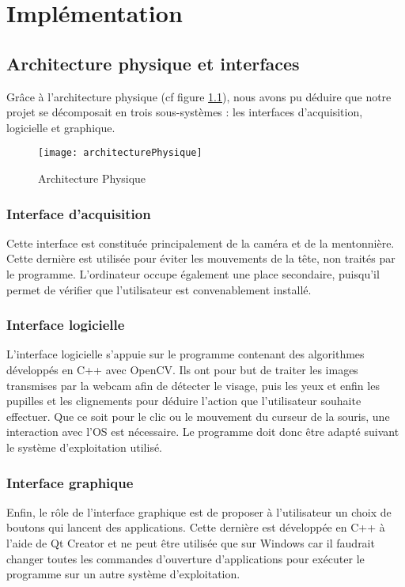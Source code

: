 \chapter{Implémentation}

\section{Architecture physique et interfaces}

Grâce à l'architecture physique (cf figure \ref{fig:archiPhysique}), nous avons pu déduire que notre projet se décomposait en trois sous-systèmes : les interfaces d'acquisition, logicielle et graphique.

\begin{figure}[H]
  \centering
  \texttt{[image: architecturePhysique]}
  \caption{Architecture Physique}
  \label{fig:archiPhysique}
\end{figure}

\subsection{Interface d'acquisition}
Cette interface est constituée principalement de la caméra et de la mentonnière. Cette dernière est utilisée pour éviter les mouvements de la tête, non traités par le programme. L'ordinateur occupe également une place secondaire, puisqu'il permet de vérifier que l'utilisateur est convenablement installé.

\subsection{Interface logicielle}
L'interface logicielle s'appuie sur le programme contenant des algorithmes développés en C++ avec OpenCV. Ils ont pour but de traiter les images transmises par la webcam afin de détecter le visage, puis les yeux et enfin les pupilles et les clignements pour déduire l'action que l'utilisateur souhaite effectuer. Que ce soit pour le clic ou le mouvement du curseur de la souris, une interaction avec l'OS est nécessaire. Le programme doit donc être adapté suivant le système d'exploitation utilisé.

\subsection{Interface graphique}
Enfin, le rôle de l'interface graphique est de proposer à l'utilisateur un choix de boutons qui lancent des applications. Cette dernière est développée en C++ à l'aide de Qt Creator et ne peut être utilisée que sur Windows car il faudrait changer toutes les commandes d'ouverture d'applications pour exécuter le programme sur un autre système d'exploitation.

